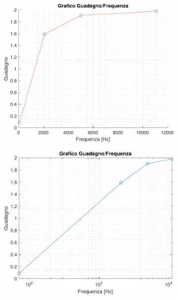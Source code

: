 \documentclass[a4paper, 12pt, twoside]{report}
\begin{document}
\begin{figure}[H]
	\hspace{-3cm}
	\centering
	\begin{subfigure}{.5\textwidth}
	\includegraphics[width=\textwidth]{imag/Gf_nonlog}
	\caption{}
	\label{fig:gfnonlog}
	\end{subfigure}
	\hfill
	\begin{subfigure}{.5\textwidth}
	\includegraphics[width=\textwidth]{imag/Gf_semilog}
	\caption{}
	\label{fig:gflog}
	\end{subfigure}
\end{figure}
\end{document}
